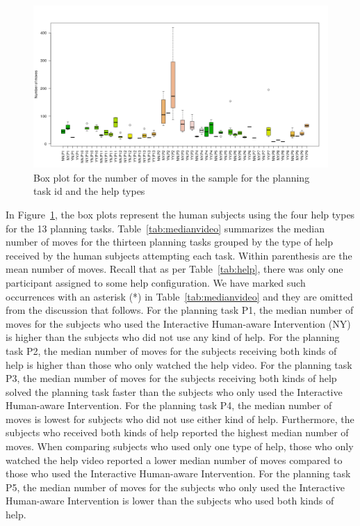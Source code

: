 \begin{figure}[tpb]
  \centering
\includegraphics[width=\columnwidth]{img/helpsbypid.png}
  \caption{Box plot for the number of moves in the sample for the planning task id and the help types}
  \label{fig:helpsbypid}
\end{figure}
In Figure~\ref{fig:helpsbypid}, the box plots represent the human subjects using the four help types for the 13 planning tasks.
Table~\ref{tab:medianvideo} summarizes the median number of moves for the thirteen planning tasks grouped by the type of help received by the human subjects attempting each task. 
Within parenthesis are the mean number of moves.
Recall that as per Table~\ref{tab:help}, there was only one participant assigned to some help configuration. 
We have marked such occurrences with an asterisk (*) in Table~\ref{tab:medianvideo} and they are omitted from the discussion that follows.
For the planning task P1, the median number of moves for the subjects who used the Interactive Human-aware Intervention (NY) is higher than the subjects who did not use any kind of help.
For the planning task P2, the median number of moves for the subjects receiving both kinds of help is higher than those who only watched the help video.
For the planning task P3, the median number of moves for the subjects receiving both kinds of help solved the planning task faster than the subjects who only used the Interactive Human-aware Intervention.
For the planning task P4, the median number of moves is lowest for subjects who did not use either kind of help.
Furthermore, the subjects who received both kinds of help reported the highest median number of moves.
When comparing subjects who used only one type of help, those who only watched the help video reported a lower median number of moves compared to those who used the Interactive Human-aware Intervention.
For the planning task P5, the median number of moves for the subjects who only used the Interactive Human-aware Intervention is lower than the subjects who used both kinds of help.
